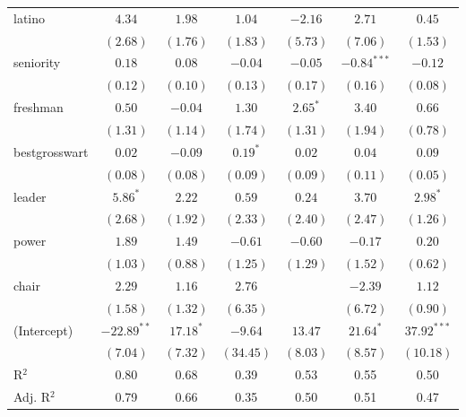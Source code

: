 \documentclass[12pt]{article}
\begin{document}
\begin{table}
\begin{center}
\begin{tabular}{l c c c c c c }
			latino                 & $4.34$        & $1.98$       & $1.04$        & $-2.16$      & $2.71$        & $0.45$        \\
			& $(2.68)$      & $(1.76)$     & $(1.83)$      & $(5.73)$     & $(7.06)$      & $(1.53)$      \\
			seniority              & $0.18$        & $0.08$       & $-0.04$       & $-0.05$      & $-0.84^{***}$ & $-0.12$       \\
			& $(0.12)$      & $(0.10)$     & $(0.13)$      & $(0.17)$     & $(0.16)$      & $(0.08)$      \\
			freshman               & $0.50$        & $-0.04$      & $1.30$        & $2.65^{*}$   & $3.40$        & $0.66$        \\
			& $(1.31)$      & $(1.14)$     & $(1.74)$      & $(1.31)$     & $(1.94)$      & $(0.78)$      \\
			bestgrosswart          & $0.02$        & $-0.09$      & $0.19^{*}$    & $0.02$       & $0.04$        & $0.09$        \\
			& $(0.08)$      & $(0.08)$     & $(0.09)$      & $(0.09)$     & $(0.11)$      & $(0.05)$      \\
			leader                 & $5.86^{*}$    & $2.22$       & $0.59$        & $0.24$       & $3.70$        & $2.98^{*}$    \\
			& $(2.68)$      & $(1.92)$     & $(2.33)$      & $(2.40)$     & $(2.47)$      & $(1.26)$      \\
			power                  & $1.89$        & $1.49$       & $-0.61$       & $-0.60$      & $-0.17$       & $0.20$        \\
			& $(1.03)$      & $(0.88)$     & $(1.25)$      & $(1.29)$     & $(1.52)$      & $(0.62)$      \\
			chair                  & $2.29$        & $1.16$       & $2.76$        &              & $-2.39$       & $1.12$        \\
			& $(1.58)$      & $(1.32)$     & $(6.35)$      &              & $(6.72)$      & $(0.90)$      \\
			(Intercept)            & $-22.89^{**}$ & $17.18^{*}$  & $-9.64$       & $13.47$      & $21.64^{*}$   & $37.92^{***}$ \\
			& $(7.04)$      & $(7.32)$     & $(34.45)$     & $(8.03)$     & $(8.57)$      & $(10.18)$     \\
			\hline
			R$^2$                  & 0.80          & 0.68         & 0.39          & 0.53         & 0.55          & 0.50          \\
			Adj. R$^2$             & 0.79          & 0.66         & 0.35          & 0.50         & 0.51          & 0.47          \\

\end{tabular}
\end{center}
\end{table}
\end{document}
